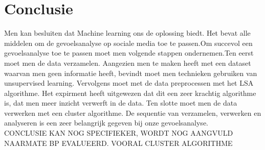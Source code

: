 \section{Conclusie}\label{Conclusie}

Men kan besluiten dat Machine learning ons de oplossing biedt. Het bevat alle middelen om de gevoelsanalyse op sociale media toe te passen.Om succevol een gevoelsanalyse toe te passen moet men volgende stappen ondernemen.Ten eerst moet men de data verzamelen. Aangezien men te maken heeft met een dataset waarvan men geen informatie heeft, bevindt moet men technieken gebruiken van unsupervised learning. Vervolgens moet met de data preprocessen met het LSA algorithme. Het expirment heeft uitgewezen dat dit een zeer krachtig algorithme is, dat men meer inzicht verwerft in de data. Ten slotte moet men de data verwerken met een cluster algorithme. De sequentie van verzamelen, verwerken en analyseren is een zeer belangrijk gegeven bij onze gevoelsanalyse.
\\
CONCLUSIE KAN NOG SPECIFIEKER, WORDT NOG AANGVULD NAARMATE BP EVALUEERD. VOORAL CLUSTER ALGORITHME
\\